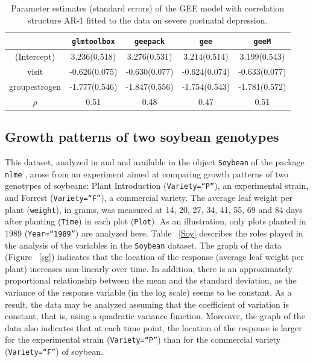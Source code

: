 \begin{table}[!ht]
{\small
\begin{center}
\begin{tabular}{ccccc} 
 \hline                                                                       
                    & {\tt glmtoolbox}& {\tt geepack} & {\tt gee}  & {\tt geeM} \\\hline                                                               
(Intercept)         &  \hfill  3.236(0.518) & \hfill 3.276(0.531)  & \hfill  3.214(0.514) & \hfill  3.199(0.543)\\                                              visit               &  \hfill -0.626(0.075) & \hfill -0.630(0.077) & \hfill -0.624(0.074) & \hfill -0.633(0.077)\\
groupestrogen       &  \hfill -1.777(0.546) & \hfill -1.847(0.556) & \hfill -1.754(0.543) & \hfill -1.781(0.572)\\
$\rho$               &               0.51    &       0.48           &        0.47          & 0.51\\\hline
\end{tabular}
\end{center}
\caption{Parameter estimates (standard errors) of the GEE model with correlation structure AR-1 fitted to the data on severe
postnatal depression.}
\label{GeesD}}
\end{table}

\subsection{Growth patterns of two soybean genotypes}
This dataset, analyzed in \cite{DG95} and \cite{PB00} and available in the object {\tt Soybean} of the package {\tt nlme} \citep{PB22}, arose from an experiment aimed at comparing growth patterns of two genotypes of soybeans: Plant Introduction ({\tt Variety=``P''}), an experimental strain, and Forrest ({\tt Variety=``F''}), a commercial variety. The average leaf weight per plant ({\tt weight}), in grams, was measured at 14, 20, 27, 34, 41, 55, 69 and 84 days after planting ({\tt Time}) in each plot ({\tt Plot}). As an illustration, only plots planted in 1989 ({\tt Year=``1989''}) are analyzed here. Table ~\ref{Soy} describes the roles played in the analysis of the variables in the {\tt Soybean} dataset. The graph of the data (Figure \!~\ref{sg}) indicates that the location of the response (average leaf weight per plant) increases non-linearly over time. In addition, there is an approximately proportional relationship between the mean and the standard deviation, as the variance of the response variable (in the log scale) seems to be constant. As a result, the data may be analyzed assuming that the coefficient of variation is constant, that is, using a quadratic variance function. Moreover, the graph of the data also indicates that at each time point, the location of the response is larger for the experimental strain ({\tt Variety=``P''}) than for the commercial variety ({\tt Variety=``F''}) of soybean.

